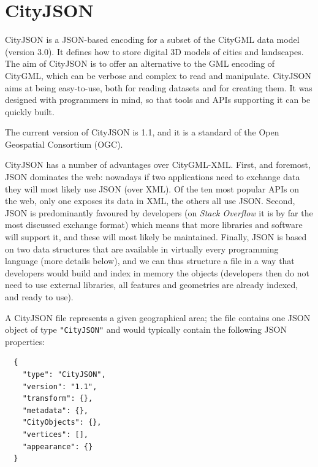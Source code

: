 \section{CityJSON}%

CityJSON is a JSON-based encoding 
for a subset of the  CityGML data model (version 3.0). 
It defines how to store digital 3D models of cities and landscapes. 
The aim of CityJSON is to offer an alternative to the GML encoding of CityGML, which can be verbose and complex to read and manipulate. 
CityJSON aims at being easy-to-use, both for reading datasets and for creating them. 
It was designed with programmers in mind, so that tools and APIs supporting it can be quickly built. 

%

The current version of CityJSON is 1.1, 
and it is a standard of the Open Geospatial Consortium (OGC).

%

CityJSON has a number of advantages over CityGML-XML.
First, and foremost, JSON dominates the web: nowadays if two applications need to exchange data they will most likely use JSON (over XML).
Of the ten most popular APIs on the web, only one exposes its data in XML, the others all use JSON.
Second, JSON is predominantly favoured by developers (on \emph{Stack Overflow} it is by far the most discussed exchange format) which means that more libraries and software will support it, and these will most likely be maintained.
Finally, JSON is based on two data structures that are available in virtually every programming language (more details below), and we can thus structure a file in a way that  developers would build and index in memory the objects (developers then do not need to use external libraries, all features and geometries are already indexed, and ready to use). 

%

A CityJSON file represents a given geographical area; the file contains one JSON object of type \texttt{"CityJSON"} and would typically contain the following JSON properties:
\begin{lstlisting}
  {
    "type": "CityJSON",
    "version": "1.1",
    "transform": {},
    "metadata": {},
    "CityObjects": {},
    "vertices": [],
    "appearance": {}
  }
\end{lstlisting}


